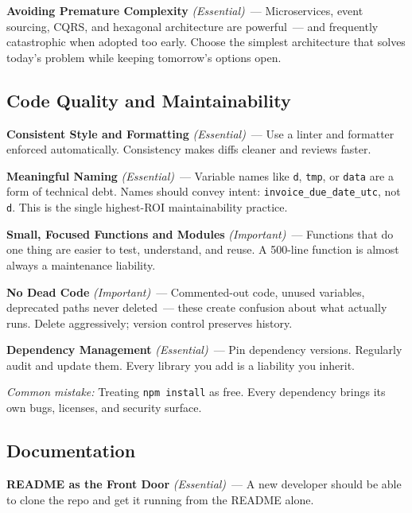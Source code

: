 \textbf{Avoiding Premature Complexity} \emph{(Essential)}~--- Microservices, event sourcing, CQRS, and hexagonal architecture are powerful~--- and frequently catastrophic when adopted too early. Choose the simplest architecture that solves today's problem while keeping tomorrow's options open.

\subsection*{Code Quality and Maintainability}\label{writing-good-code:code-quality-and-maintainability}

\textbf{Consistent Style and Formatting} \emph{(Essential)}~--- Use a linter and formatter enforced automatically. Consistency makes diffs cleaner and reviews faster.

\textbf{Meaningful Naming} \emph{(Essential)}~--- Variable names like \texttt{d}, \texttt{tmp}, or \texttt{data} are a form of technical debt. Names should convey intent: \texttt{invoice\_due\_date\_utc}, not \texttt{d}. This is the single highest-ROI maintainability practice.

\textbf{Small, Focused Functions and Modules} \emph{(Important)}~--- Functions that do one thing are easier to test, understand, and reuse. A 500-line function is almost always a maintenance liability.

\textbf{No Dead Code} \emph{(Important)}~--- Commented-out code, unused variables, deprecated paths never deleted~--- these create confusion about what actually runs. Delete aggressively; version control preserves history.

\textbf{Dependency Management} \emph{(Essential)}~--- Pin dependency versions. Regularly audit and update them. Every library you add is a liability you inherit.

\begin{notebox}

\emph{Common mistake:} Treating \texttt{npm\ install} as free. Every dependency brings its own bugs, licenses, and security surface.

\end{notebox}

\subsection*{Documentation}\label{writing-good-code:documentation}

\textbf{README as the Front Door} \emph{(Essential)}~--- A new developer should be able to clone the repo and get it running from the README alone.

